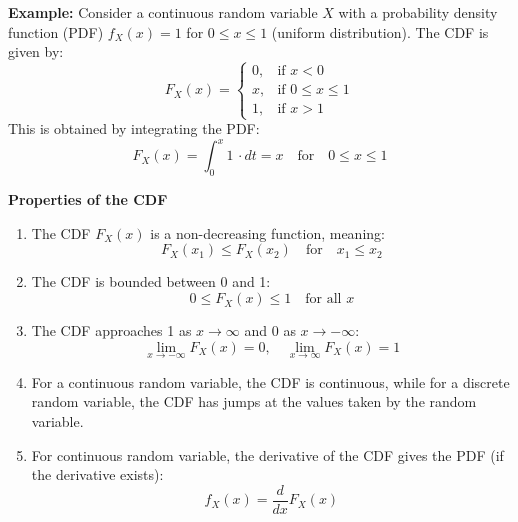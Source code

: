 \documentclass[twoside]{book}
\begin{document}
\textbf{Example:} Consider a continuous random variable \( X \) with a probability density function (PDF) \( f_X(x) = 1 \) for \( 0 \leq x \leq 1 \) (uniform distribution). The CDF is given by:
\[
F_X(x) =
\begin{cases}
0, & \text{if } x < 0 \\
x, & \text{if } 0 \leq x \leq 1 \\
1, & \text{if } x > 1
\end{cases}
\]
This is obtained by integrating the PDF:
\[
F_X(x) = \int_0^x 1 \,\cdot dt = x \quad \text{for} \quad 0 \leq x \leq 1
\]

\begin{center}
\end{center}

\textbf{Properties of the CDF}
\begin{enumerate}
    \item The CDF \( F_X(x) \) is a non-decreasing function, meaning:
   \[
   F_X(x_1) \leq F_X(x_2) \quad \text{for} \quad x_1 \leq x_2
   \]
    \item The CDF is bounded between 0 and 1:
   \[
   0 \leq F_X(x) \leq 1 \quad \text{for all } x
   \]
    \item The CDF approaches 1 as \( x \to \infty \) and 0 as \( x \to -\infty \):
   \[
   \lim_{x \to -\infty} F_X(x) = 0, \quad \lim_{x \to \infty} F_X(x) = 1
   \]
    \item For a continuous random variable, the CDF is continuous, while for a discrete random variable, the CDF has jumps at the values taken by the random variable.
    \item For continuous random variable, the derivative of the CDF gives the PDF (if the derivative exists): \[ f_X(x) = \frac{d}{dx}F_X(x) \]
\end{enumerate}
\end{document}

